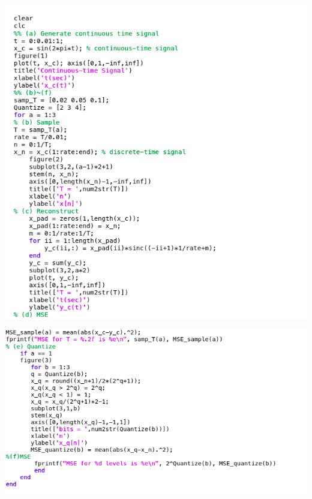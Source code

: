 \documentclass[a4paper]{article}
\begin{document}
	
	\begin{center}
		\includegraphics[width=1\linewidth]{screenshot071}
	\end{center}
	
	\begin{center}
		\includegraphics[width=1\linewidth]{screenshot072}
	\end{center}
	
	
\newpage

\end{document}
